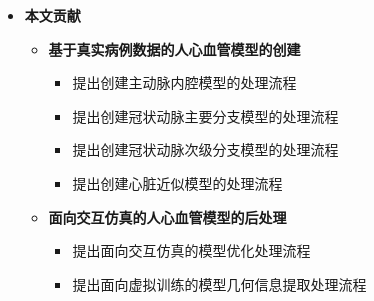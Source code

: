 \begin{frame}
\begin{itemize}
  \item \textbf{本文贡献}
  \begin{itemize}
     \item \textbf{基于真实病例数据的人心血管模型的创建}
    \begin{itemize}
       \item 提出创建主动脉内腔模型的处理流程
       \item 提出创建冠状动脉主要分支模型的处理流程
       \item 提出创建冠状动脉次级分支模型的处理流程
       \item 提出创建心脏近似模型的处理流程
    \end{itemize}
     \item \textbf{面向交互仿真的人心血管模型的后处理}
    \begin{itemize}
       \item 提出面向交互仿真的模型优化处理流程
       \item 提出面向虚拟训练的模型几何信息提取处理流程
    \end{itemize}
  \end{itemize}
\end{itemize}
\end{frame} 